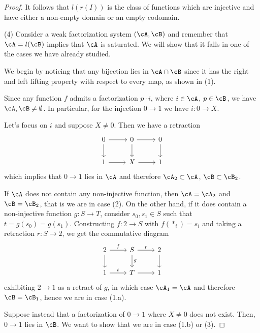 \documentclass[a4paper,11pt,openany]{scrartcl}
\begin{document}
\begin{proof}
    It follows that $l(r(I))$ is the class of functions which are
    injective and have either a non-empty domain or an empty codomain.

    (4) Consider a weak factorization system $(\cA,\cB)$ and remember that
    $\cA=l(\cB)$ implies that $\cA$ is saturated. We will show that it
    falls in one of the cases we have already studied.

    We begin by noticing that any bijection
    lies in $\cA\cap\cB$ since it has the right and left lifting property with
    respect to every map, as shown in (1).

    Since any function $f$ admits a factorization
    $p\cdot i$, where $i\in\cA$, $p\in\cB$, we have $\cA,\cB\neq\emptyset$. In
    particular, for the injection $0\rightarrow 1$ we have $i\colon 0\rightarrow
    X$.

    Let's focus on $i$ and suppose $X\neq 0$. Then we have a retraction
    \[\begin{tikzcd}
	{0} & {0} & {0} \\
	{1} & {X} & {1}
	\arrow[from=1-1, to=1-2]
	\arrow[from=1-2, to=1-3]
	\arrow[from=1-1, to=2-1]
	\arrow[from=1-2, to=2-2]
	\arrow[from=1-3, to=2-3]
	\arrow[from=2-2, to=2-3]
	\arrow[from=2-1, to=2-2]
    \end{tikzcd}\]
    which implies that $0\rightarrow 1$ lies in $\cA$ and therefore
    $\cA_2\subset\cA$, $\cB\subset\cB_2$.

    If $\cA$ does not contain any non-injective function, then $\cA=\cA_2$ and
    $\cB=\cB_2$, that is we are in case (2). On the other hand, if it does
    contain a non-injective function
    $g\colon S\rightarrow T$, consider $s_0,s_1\in S$ such that
    $t=g(s_0)=g(s_1)$. Constructing $f\colon 2\rightarrow S$ with $f(*_i)=s_i$
    and taking a retraction $r\colon S\rightarrow 2$, we get the commutative
    diagram
    \[\begin{tikzcd}
	{2} & {S} & {2} \\
	{1} & {T} & {1}
	\arrow["f", from=1-1, to=1-2]
	\arrow["r", from=1-2, to=1-3]
	\arrow[from=1-1, to=2-1]
	\arrow["g", from=1-2, to=2-2]
	\arrow[from=1-3, to=2-3]
	\arrow[from=2-2, to=2-3]
	\arrow["t", from=2-1, to=2-2]
    \end{tikzcd}\]
    exhibiting $2\rightarrow 1$ as a retract of $g$, in which case $\cA_1=\cA$
    and therefore $\cB=\cB_1$, hence we are in case (1.a).

    Suppose instead that a factorization of $0\rightarrow 1$ where $X\neq 0$
    does not exist. Then, $0\rightarrow 1$ lies in $\cB$. We want to show that
    we are in case (1.b) or (3).


\end{proof}
\end{document}
